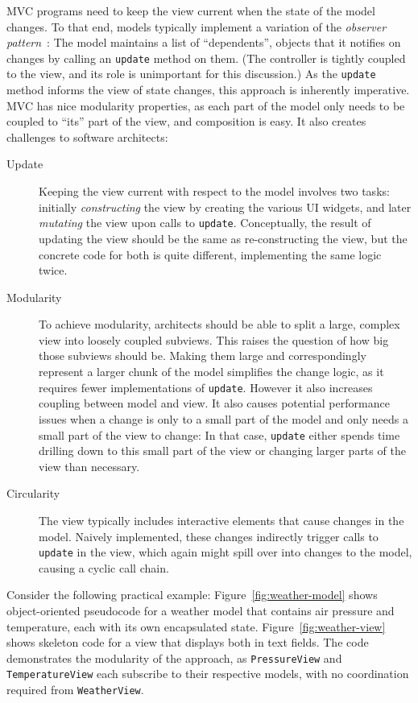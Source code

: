 \documentclass[sigplan,screen]{acmart}
\begin{document}
MVC programs need to keep the view current when the state of the model
changes.  To that end, models typically implement a variation of the
\textit{observer pattern}~\cite{GoF}: The model maintains a list of
``dependents'', objects that it notifies on changes by calling
an \texttt{update} method on them.  (The controller is tightly coupled to the
view, and its role is unimportant for this discussion.)
As the \texttt{update} method informs the view of state changes, this
approach is inherently imperative.  MVC has nice modularity
properties, as each part of the model only needs to be coupled to
``its'' part of the view, and composition is easy.
It also creates challenges to
software architects:
\label{sec:challenges}
%
\begin{description}
\item[\hypertarget{challenge:update}{Update}] Keeping the view current with respect to the model involves two
  tasks: initially \emph{constructing} the view by creating the
  various UI widgets, and later \emph{mutating} the view upon calls to
  \texttt{update}.  Conceptually, the result of updating the view
  should be the same as re-constructing the view, but the concrete
  code for both is quite different, implementing the same logic twice.
\item[\hypertarget{challenge:modularity}{Modularity}] To achieve modularity, architects should be able to split a large,
  complex view into loosely coupled subviews.  This raises the
  question of how big those subviews should be. Making them large and
  correspondingly represent a larger chunk of the model
  simplifies the change logic, as it requires fewer implementations of
  \texttt{update}. However it also increases coupling between model
  and view.  It also causes potential performance issues when 
  a change is only to a small part of the model and only needs a
  small part of the view to change: In that case, \texttt{update}
  either spends time drilling down to this small part of the view or
  changing larger parts of the view than necessary.
\item[\hypertarget{challenge:circularity}{Circularity}] The view typically
  includes interactive elements that cause changes in the model.
  Naively implemented, these changes indirectly trigger calls to
  \texttt{update} in the view, which again might spill over into
  changes to the model, causing a cyclic call chain.
\end{description}
%
%
Consider the following practical example:
Figure~\ref{fig:weather-model} shows object-oriented pseudocode for a
weather model that contains air pressure and temperature, each with
its own encapsulated state.  Figure~\ref{fig:weather-view} shows
skeleton code for a view that displays both in text fields.  The code
demonstrates the modularity of the approach, as
\texttt{PressureView} and \texttt{TemperatureView} each subscribe to
their respective models, with no coordination required from
\texttt{WeatherView}.
\end{document}

